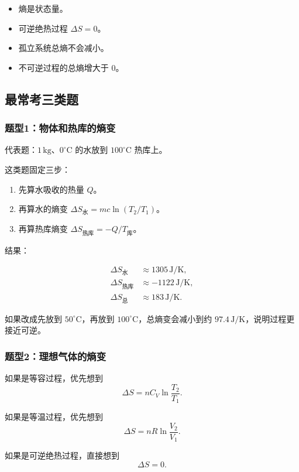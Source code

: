 \documentclass[12pt,a4paper]{article}
\begin{document}
\begin{itemize}
  \item 熵是状态量。
  \item 可逆绝热过程 $\Delta S = 0$。
  \item 孤立系统总熵不会减小。
  \item 不可逆过程的总熵增大于 0。
\end{itemize}

\subsection{最常考三类题}

\subsubsection*{题型1：物体和热库的熵变}

代表题：$1\,\mathrm{kg}$、$0^\circ\mathrm{C}$ 的水放到 $100^\circ\mathrm{C}$ 热库上。

这类题固定三步：

\begin{enumerate}
  \item 先算水吸收的热量 $Q$。
  \item 再算水的熵变 $\Delta S_{\text{水}} = mc\ln(T_2/T_1)$。
  \item 再算热库熵变 $\Delta S_{\text{热库}} = -Q/T_{\text{库}}$。
\end{enumerate}

结果：

\begin{align*}
\Delta S_{\text{水}} &\approx 1305\,\mathrm{J/K},\\
\Delta S_{\text{热库}} &\approx -1122\,\mathrm{J/K},\\
\Delta S_{\text{总}} &\approx 183\,\mathrm{J/K}.
\end{align*}

如果改成先放到 $50^\circ\mathrm{C}$，再放到 $100^\circ\mathrm{C}$，总熵变会减小到约 $97.4\,\mathrm{J/K}$，说明过程更接近可逆。

\subsubsection*{题型2：理想气体的熵变}

如果是等容过程，优先想到
\[
\Delta S = nC_V \ln\frac{T_2}{T_1}.
\]

如果是等温过程，优先想到
\[
\Delta S = nR \ln\frac{V_2}{V_1}.
\]

如果是可逆绝热过程，直接想到
\[
\Delta S = 0.
\]
\end{document}
